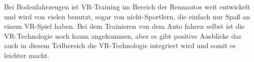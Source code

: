 Bei Bodenfahrzeugen ist VR-Training im Bereich der Rennautos weit entwickelt und wird von vielen benutzt, sogar von nicht-Sportlern, die einfach nur Spaß an einem VR-Spiel haben. Bei dem Trainieren von dem Auto fahren selbst ist die VR-Technologie noch kaum angekommen, aber es gibt positive Ausblicke das auch in diesem Teilbereich die VR-Technologie integriert wird und somit es leichter macht.
